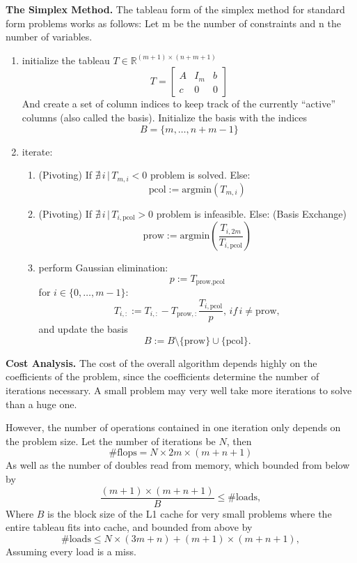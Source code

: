\documentclass[letterpaper]{article}
\newcommand{\mypar}[1]{{\bf #1.}}
\begin{document}
\mypar{The Simplex Method}
The tableau form of the simplex method for standard form problems works as follows:
Let m be the number of constraints and n the number of variables.
\begin{enumerate}
    \item initialize the tableau $T \in \mathbb{R}^{(m+1) \times (n+m+1)}$
        \[ T = 
            \left[
            \begin{matrix}
                A & I_m & b \\
                c & 0 & 0
            \end{matrix}
            \right]
        \]
        And create a set of column indices to keep track of the currently ``active'' columns (also called the basis). 
        Initialize the basis with the indices 
        \[ B = \{ m, \dots, n+m-1 \} \]
    \item iterate:
        \begin{enumerate}
            \item (Pivoting) If $\nexists\, i\, |\, T_{m,i} < 0$ problem is solved. Else:
                \[\text{pcol} := \text{argmin}\left(T_{m,i}\right)\]
            \item (Pivoting) If $\nexists\, i\, |\, T_{i, \text{pcol}} > 0$ problem is infeasible. Else:
                (Basis Exchange)\[\text{prow} := \text{argmin}\left(\frac{T_{i, 2m}}{T_{i,\text{pcol}}} \right)\]
            \item perform Gaussian elimination:
                \[p :=  T_{\text{prow}, \text{pcol}}\]
                for $i \in \{0, \dots, m-1\}$:
                \[ T_{i,:} := T_{i,:} - T_{\text{prow},:} \frac{T_{i,\text{pcol}}}{p},\, if\, i \neq \text{prow}, \]
                and update the basis
                \[ B := B \setminus \{\text{prow}\} \cup \{\text{pcol}\}. \]
        \end{enumerate}
\end{enumerate}

\mypar{Cost Analysis}
The cost of the overall algorithm depends highly on the coefficients of the problem,
since the coefficients determine the number of iterations necessary. 
A small problem may very well take more iterations to solve than a huge one.

However, the number of operations contained in one iteration only depends on the problem size.
Let the number of iterations be $N$, then
\[ \text{\#flops} = N \times 2 m \times (m + n + 1) \]
As well as the number of doubles read from memory, which bounded from below by
\[ \frac{(m + 1) \times (m + n + 1)}{B} \leq \text{\#loads}, \]
Where $B$ is the block size of the L1 cache for very small problems where the entire
tableau fits into cache, and bounded from above by
\[ \text{\#loads} \leq N \times (3m + n) + (m + 1) \times (m + n + 1), \]
Assuming every load is a miss.
\end{document}
